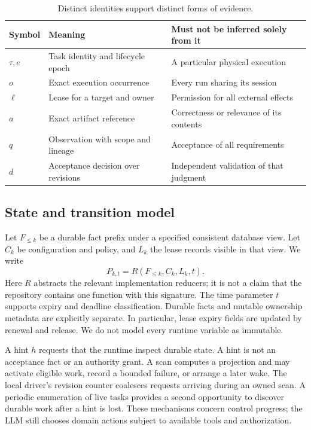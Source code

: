 \begin{table}[htbp]
\centering\small
\begin{tabularx}{\linewidth}{@{}lYY@{}}
\toprule
Symbol & Meaning & Must not be inferred solely from it \\
\midrule
$\tau,e$ & Task identity and lifecycle epoch & A particular physical execution \\
$o$ & Exact execution occurrence & Every run sharing its session \\
$\ell$ & Lease for a target and owner & Permission for all external effects \\
$a$ & Exact artifact reference & Correctness or relevance of its contents \\
$q$ & Observation with scope and lineage & Acceptance of all requirements \\
$d$ & Acceptance decision over revisions & Independent validation of that judgment \\
\bottomrule
\end{tabularx}
\caption{Distinct identities support distinct forms of evidence.}\label{tab:objects}
\end{table}

\subsection{State and transition model}
Let $F_{\leq k}$ be a durable fact prefix under a specified consistent database view. Let $C_k$ be configuration and policy, and $L_k$ the lease records visible in that view. We write
\begin{equation}\label{eq:projection}
P_{k,t}=R(F_{\leq k},C_k,L_k,t).
\end{equation}
Here $R$ abstracts the relevant implementation reducers; it is not a claim that the repository contains one function with this signature. The time parameter $t$ supports expiry and deadline classification. Durable facts and mutable ownership metadata are explicitly separate. In particular, lease expiry fields are updated by renewal and release. We do not model every runtime variable as immutable.

A hint $h$ requests that the runtime inspect durable state. A hint is not an acceptance fact or an authority grant. A scan computes a projection and may activate eligible work, record a bounded failure, or arrange a later wake. The local driver's revision counter coalesces requests arriving during an owned scan. A periodic enumeration of live tasks provides a second opportunity to discover durable work after a hint is lost. These mechanisms concern control progress; the LLM still chooses domain actions subject to available tools and authorization.

